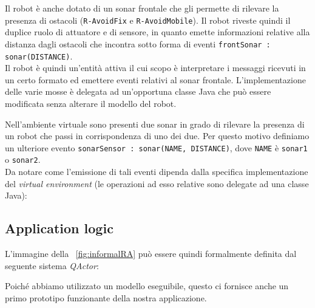 \documentclass{../llncs}
\newcommand{\codescript}[1]{{\mbox{\small{\texttt{#1}}}}\xspace}
\newcommand{\code}[1]{{\color{blue}\small{\texttt{#1}}}}
\newcommand{\qa}{\textsf{\textit{QActor}}}
\newcommand{\xf}[1]{\figurename~\ref{fig:#1}}
\begin{document}
Il robot è anche dotato di un sonar frontale che gli permette di rilevare la presenza di ostacoli (\code{R-AvoidFix} e \code{R-AvoidMobile}). Il robot riveste quindi il duplice ruolo di attuatore e di sensore, in quanto emette informazioni relative alla distanza dagli ostacoli che incontra sotto forma di eventi \codescript{frontSonar : sonar(DISTANCE)}.\\

Il robot è quindi un'entità attiva il cui scopo è interpretare i messaggi ricevuti in un certo formato ed emettere eventi relativi al sonar frontale. L'implementazione delle varie mosse è delegata ad un'opportuna classe Java che può essere modificata senza alterare il modello del robot.\\



\vspace{8px}

Nell'ambiente virtuale sono presenti due sonar in grado di rilevare la presenza di un robot che passi in corrispondenza di uno dei due. Per questo motivo definiamo un ulteriore evento \codescript{sonarSensor : sonar(NAME, DISTANCE)}, dove \codescript{NAME} è \code{sonar1} o \code{sonar2}.\\

Da notare come l'emissione di tali eventi dipenda dalla specifica implementazione del \textit{virtual environment} (le operazioni ad esso relative sono delegate ad una classe Java):



\subsection{Application logic}
L'immagine della \xf{informalRA} può essere quindi formalmente definita dal seguente sistema {\qa}:\\



\vspace{8px}



Poiché abbiamo utilizzato un modello eseguibile, questo ci fornisce anche un primo prototipo funzionante della nostra applicazione.
\end{document}
